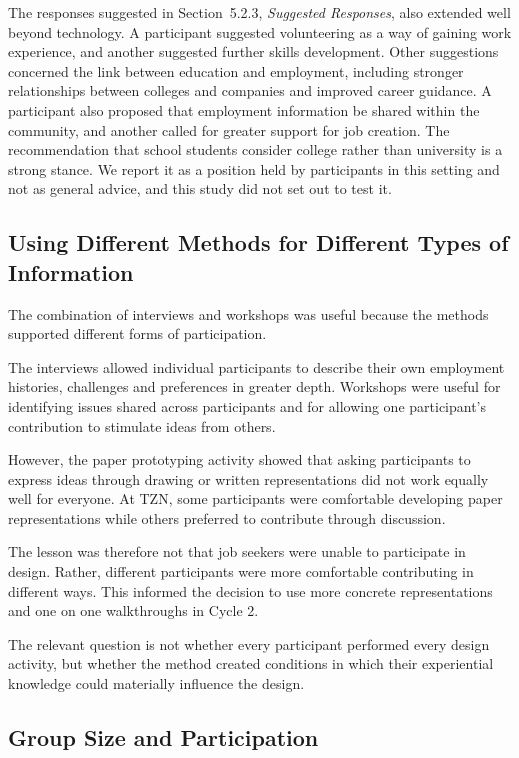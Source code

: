 The responses suggested in Section~5.2.3, \textit{Suggested Responses}, also extended well beyond technology. A participant suggested volunteering as a way of gaining work experience, and another suggested further skills development. Other suggestions concerned the link between education and employment, including stronger relationships between colleges and companies and improved career guidance. A participant also proposed that employment information be shared within the community, and another called for greater support for job creation. The recommendation that school students consider college rather than university is a strong stance. We report it as a position held by participants in this setting and not as general advice, and this study did not set out to test it.

\subsection{Using Different Methods for Different Types of Information}

The combination of interviews and workshops was useful because the methods supported different forms of participation.

The interviews allowed individual participants to describe their own employment histories, challenges and preferences in greater depth. Workshops were useful for identifying issues shared across participants and for allowing one participant's contribution to stimulate ideas from others.

However, the paper prototyping activity showed that asking participants to express ideas through drawing or written representations did not work equally well for everyone. At TZN, some participants were comfortable developing paper representations while others preferred to contribute through discussion.

The lesson was therefore not that job seekers were unable to participate in design. Rather, different participants were more comfortable contributing in different ways. This informed the decision to use more concrete representations and one on one walkthroughs in Cycle 2.

The relevant question is not whether every participant performed every design activity, but whether the method created conditions in which their experiential knowledge could materially influence the design.


\subsection{Group Size and Participation}

